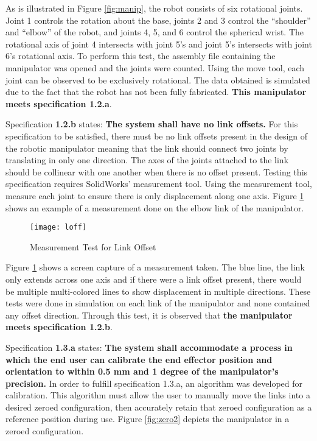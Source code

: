 As is illustrated in Figure \ref{fig:manip}, the robot consists of six rotational joints. Joint 1 controls the rotation about the base,  joints 2 and 3 control the “shoulder” and “elbow” of the robot, and joints 4, 5, and 6 control the  spherical wrist. The rotational axis of joint 4 intersects with joint 5’s and joint 5’s intersects with joint 6’s rotational axis. To perform this test, the assembly file containing the manipulator was opened and the joints were counted. Using the move tool, each joint can be observed to be exclusively rotational. The data obtained is simulated due to the fact that the robot has not been fully fabricated. \textbf{This manipulator meets specification 1.2.a}.

Specification \textbf{1.2.b} states: \textbf{The system shall have no link offsets.} For this specification to be satisfied, there must be no link offsets present in the design of the robotic manipulator meaning that the link should connect two joints by translating in only one direction. The axes of the joints attached to the link should be collinear with one another when there is no offset present. Testing this specification requires SolidWorks’ measurement tool. Using the measurement tool, measure each joint to ensure there is only displacement along one axis. Figure \ref{fig:loff} shows an example of a measurement done on the elbow link of the manipulator.

\newpage
\begin{figure}[htp]
  \centering
  \texttt{[image: loff]}
  \caption{Measurement Test for Link Offset}
  \label{fig:loff}
\end{figure}

Figure \ref{fig:loff} shows a screen capture of a measurement taken. The blue line, the link only extends across one axis and if there were a link offset present, there would be multiple multi-colored lines to show displacement in multiple directions. These tests were done in simulation on each link of the manipulator and none contained any offset direction. Through this test, it is observed that \textbf{the manipulator meets specification 1.2.b}.

Specification \textbf{1.3.a} states: \textbf{The system shall accommodate a process in which the end user can calibrate the end effector position and orientation to within 0.5 mm and 1 degree of the manipulator’s precision.} In order to fulfill specification 1.3.a, an algorithm was developed for calibration. This algorithm must allow the user to manually move the links into a desired zeroed configuration, then accurately retain that zeroed configuration as a reference position during use. Figure \ref{fig:zero2} depicts the manipulator in a zeroed configuration.

